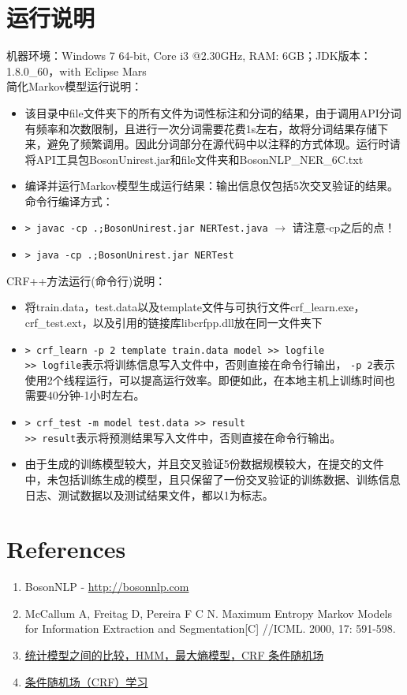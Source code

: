 \documentclass[11pt]{article}
\begin{document}
\section{运行说明}
机器环境：Windows 7 64-bit, Core i3 @2.30GHz, RAM: 6GB；JDK版本：1.8.0\_60，with Eclipse Mars\\
简化Markov模型运行说明：
\begin{itemize}
\setlength{\itemsep}{-5pt}
  \item 该目录中file文件夹下的所有文件为词性标注和分词的结果，由于调用API分词有频率和次数限制，且进行一次分词需要花费1s左右，故将分词结果存储下来，避免了频繁调用。因此分词部分在源代码中以注释的方式体现。运行时请将API工具包BosonUnirest.jar和file文件夹和BosonNLP\_NER\_6C.txt
  \item 编译并运行Markov模型生成运行结果：输出信息仅包括5次交叉验证的结果。命令行编译方式：
  \item \texttt{> javac -cp .;BosonUnirest.jar NERTest.java} $\rightarrow$ 请注意-cp之后的点！
  \item \texttt{> java -cp .;BosonUnirest.jar NERTest}
\end{itemize}
\indent CRF++方法运行(命令行)说明：
\begin{itemize}
\setlength{\itemsep}{-5pt}
  \item 将train.data，test.data以及template文件与可执行文件crf\_learn.exe，crf\_test.ext，以及引用的链接库libcrfpp.dll放在同一文件夹下
  \item \texttt{> crf\_learn -p 2 template train.data model >> logfile} \\
    \texttt{>> logfile}表示将训练信息写入文件中，否则直接在命令行输出， \texttt{-p 2}表示使用2个线程运行，可以提高运行效率。即便如此，在本地主机上训练时间也需要40分钟-1小时左右。
  \item \texttt{> crf\_test -m model test.data >> result}\\
    \texttt{>> result}表示将预测结果写入文件中，否则直接在命令行输出。
  \item 由于生成的训练模型较大，并且交叉验证5份数据规模较大，在提交的文件中，未包括训练生成的模型，且只保留了一份交叉验证的训练数据、训练信息日志、测试数据以及测试结果文件，都以1为标志。
\end{itemize}
\section{References}
\begin{enumerate}
\item BosonNLP - \href{http://bosonnlp.com}{ http://bosonnlp.com }
\item McCallum A, Freitag D, Pereira F C N. Maximum Entropy Markov Models for Information Extraction and Segmentation[C] //ICML. 2000, 17: 591-598.
\item \href{http://blog.sina.com.cn/s/blog\_8af106960102v0v1.html}{统计模型之间的比较，HMM，最大熵模型，CRF 条件随机场}
\item \href{http://blog.sciencenet.cn/blog-261330-682779.html}{条件随机场（CRF）学习}
\end{enumerate}
\end{document}
